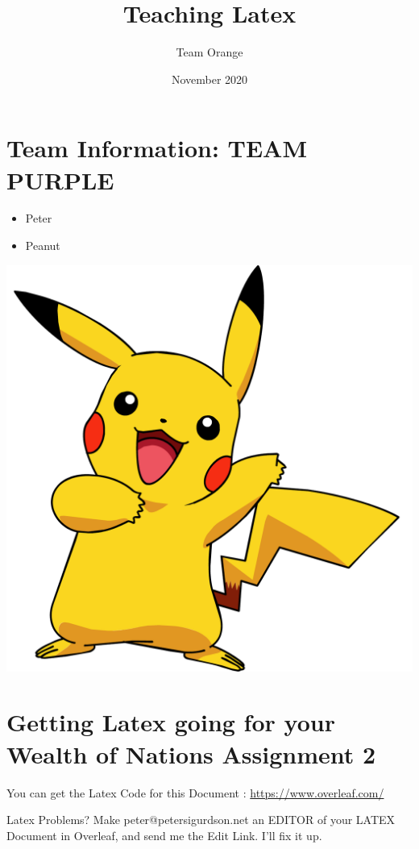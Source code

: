 \documentclass{article}
\title{Teaching Latex}
\author{Team Orange }
\date{November 2020}
\begin{document}
\maketitle
\section * {Team Information: TEAM PURPLE}
\begin{itemize}
    \item Peter
    \item Peanut
\end{itemize}
\includegraphics[scale=0.1]{5Pikachu.png}

\section {Getting Latex going for your Wealth of Nations Assignment 2}

You can get the Latex Code for this Document :
\url{https://www.overleaf.com/} 
\newline
 
Latex Problems? Make peter@petersigurdson.net an EDITOR of 
your LATEX Document in Overleaf, and send me the Edit Link. I'll fix it up. 
 



 
\end{document}
